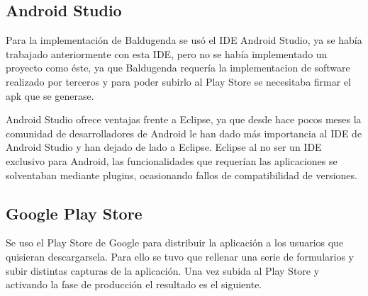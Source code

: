 \subsection{Android Studio}
\label{subsecc:androidStudio}

Para la implementación de Baldugenda se usó el IDE Android Studio, ya se había trabajado anteriormente con esta IDE, pero no se había implementado un proyecto como éste, ya que Baldugenda requería la implementacion de software realizado por terceros y para poder subirlo al Play Store se necesitaba firmar el apk que se generase. 

Android Studio ofrece ventajas frente a Eclipse, ya que desde hace pocos meses la comunidad de desarrolladores de Android le han dado más importancia al IDE de Android Studio y han dejado de lado a Eclipse. Eclipse al no ser un IDE exclusivo para Android, las funcionalidades que requerían las aplicaciones se solventaban mediante plugins, ocasionando fallos de compatibilidad de versiones.
\newpage
\subsection{Google Play Store}
\label{subsecc:Google Play Store}

Se uso el Play Store de Google para distribuir la aplicación a los usuarios que quisieran descargarsela. Para ello se tuvo que rellenar una serie de formularios y subir distintas capturas de la aplicación. Una vez subida al Play Store y activando la fase de producción el resultado es el siguiente.

